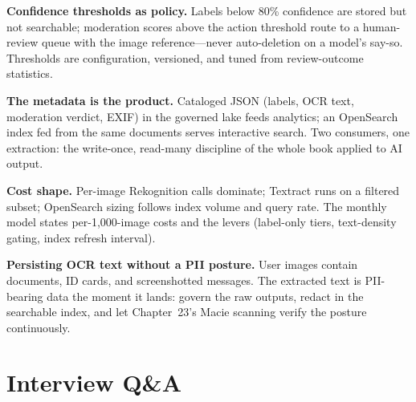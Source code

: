 \textbf{Confidence thresholds as policy.} Labels below 80\% confidence are stored but not searchable; moderation scores above the action threshold route to a human-review queue with the image reference---never auto-deletion on a model's say-so. Thresholds are configuration, versioned, and tuned from review-outcome statistics.

\textbf{The metadata is the product.} Cataloged JSON (labels, OCR text, moderation verdict, EXIF) in the governed lake feeds analytics; an OpenSearch index fed from the same documents serves interactive search. Two consumers, one extraction: the write-once, read-many discipline of the whole book applied to AI output.

\textbf{Cost shape.} Per-image Rekognition calls dominate; Textract runs on a filtered subset; OpenSearch sizing follows index volume and query rate. The monthly model states per-1{,}000-image costs and the levers (label-only tiers, text-density gating, index refresh interval).

\begin{pitfall}
\textbf{Persisting OCR text without a PII posture.} User images contain documents, ID cards, and screenshotted messages. The extracted text is PII-bearing data the moment it lands: govern the raw outputs, redact in the searchable index, and let Chapter~23's Macie scanning verify the posture continuously.
\end{pitfall}

\section{Interview Q\&A}
